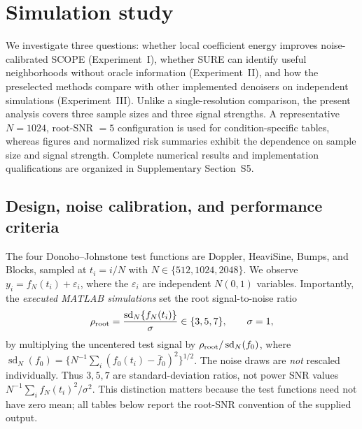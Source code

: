 \section{Simulation study}
\label{sec:simul}

We investigate three questions: whether local coefficient energy improves
noise-calibrated SCOPE (Experiment~I), whether SURE can identify useful
neighborhoods without oracle information (Experiment~II), and how the
preselected methods compare with other implemented denoisers on independent
simulations (Experiment~III). Unlike a single-resolution comparison, the
present analysis covers three sample sizes and three signal strengths.
A representative $N=1024$, root-SNR $=5$ configuration is used for
condition-specific tables, whereas figures and normalized risk summaries
exhibit the dependence on sample size and signal strength. Complete numerical
results and implementation qualifications are organized in Supplementary
Section~S5.

\subsection{Design, noise calibration, and performance criteria}
\label{sec:simul-design}

The four Donoho--Johnstone test functions are Doppler, HeaviSine, Bumps,
and Blocks, sampled at $t_i=i/N$ with
$N\in\{512,1024,2048\}$. We observe
$y_i=f_N(t_i)+\varepsilon_i$, where the $\varepsilon_i$ are independent
$N(0,1)$ variables. Importantly, the \emph{executed MATLAB simulations}
set the root signal-to-noise ratio
\begin{eqnarray}
\rho_{\rm root} = \frac{\operatorname{sd}_N\{f_N(t_i)\}}{\sigma}
\in\{3,5,7\}, \qquad \sigma=1,
\label{eq:simul-root-snr}
\end{eqnarray}
by multiplying the uncentered test signal by
$\rho_{\rm root}/\operatorname{sd}_N(f_0)$, where
$\operatorname{sd}_N(f_0)=\{N^{-1}\sum_i(f_0(t_i)-\bar f_0)^2\}^{1/2}$.
The noise draws are \emph{not} rescaled individually. Thus $3,5,7$ are
standard-deviation ratios, not power SNR values
$N^{-1}\sum_i f_N(t_i)^2/\sigma^2$. This distinction matters because the
test functions need not have zero mean; all tables below report the
root-SNR convention of the supplied output.

